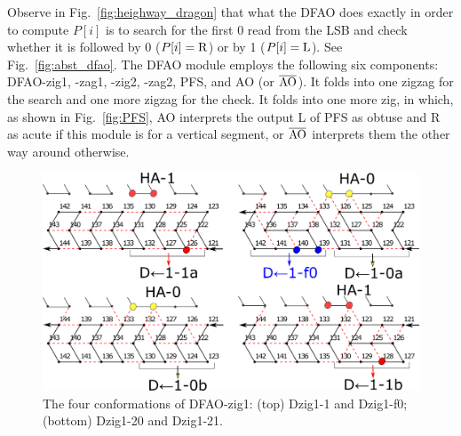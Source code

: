 Observe in Fig.~\ref{fig:heighway_dragon} that what the DFAO does exactly in order to compute $P[i]$ is to search for the first 0 read from the LSB and check whether it is followed by 0 ($P[i] = {\rm R}$) or by 1 ($P[i] = {\rm L}$). 
See Fig.~\ref{fig:abst_dfao}. 
The DFAO module employs the following six components: DFAO-zig1, -zag1, -zig2, -zag2, PFS, and AO (or $\overline{\rm AO}$). 
It folds into one zigzag for the search and one more zigzag for the check. 
It folds into one more zig, in which, as shown in Fig.~\ref{fig:PFS}, AO interprets the output L of PFS as obtuse and R as acute if this module is for a vertical segment, or $\overline{\rm AO}$ interprets them the other way around otherwise. 

\begin{figure}
\vspace*{-5mm}
\centering
\includegraphics[width=\linewidth]{pic/DFAO-zig1.png}  
\caption{The four conformations of DFAO-zig1: (top) Dzig1-1 and Dzig1-f0; (bottom) Dzig1-20 and Dzig1-21.}
\label{fig:DFAO-zig1}
\vspace*{-3mm}
\end{figure}

